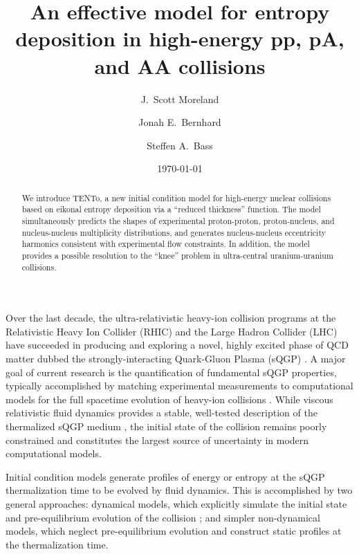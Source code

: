 \documentclass[aps,prc,reprint,amsmath,nofootinbib]{revtex4-1}
\newcommand{\psec}[1]{\phantomsection\addcontentsline{toc}{section}{#1}}
\newcommand{\trento}{T\raisebox{-.5ex}{R}ENTo}
\begin{document}
\title{An effective model for entropy deposition in high-energy pp, pA, and AA collisions}

\author{J.\ Scott Moreland}
\author{Jonah E.\ Bernhard}
\author{Steffen A.\ Bass}

\date{\today}


\begin{abstract}
  We introduce \trento, a new initial condition model for high-energy nuclear collisions based on eikonal entropy deposition via a ``reduced thickness'' function.
  The model simultaneously predicts the shapes of experimental proton-proton, proton-nucleus, and nucleus-nucleus multiplicity distributions, and generates nucleus-nucleus eccentricity harmonics consistent with experimental flow constraints.
  In addition, the model provides a possible resolution to the ``knee'' problem in ultra-central uranium-uranium collisions.
\end{abstract}


\maketitle

\psec{Introduction}

Over the last decade, the ultra-relativistic heavy-ion collision programs at the Relativistic Heavy Ion Collider (RHIC) and the Large Hadron Collider (LHC) have succeeded in producing and exploring a novel, highly excited phase of QCD matter dubbed the strongly-interacting Quark-Gluon Plasma (sQGP)
\cite{Arsene:2004fa,Adcox:2004mh,Back:2004je,Adams:2005dq,Gyulassy:2004zy,Muller:2006ee,Muller:2012zq}.
A major goal of current research is the quantification of fundamental sQGP properties, typically accomplished by matching experimental measurements to computational models for the full spacetime evolution of heavy-ion collisions \cite{Petersen:2010zt,Novak:2013bqa}.
While viscous relativistic fluid dynamics provides a stable, well-tested description of the thermalized sQGP medium \cite{Baier:2006gy,Song:2007ux,Luzum:2008cw,Schenke:2010rr,Shen:2011eg,Shen:2014vra}, the initial state of the collision remains poorly constrained and constitutes the largest source of uncertainty in modern computational models.

Initial condition models generate profiles of energy or entropy at the sQGP thermalization time to be evolved by fluid dynamics.
This is accomplished by two general approaches:
dynamical models, which explicitly simulate the initial state and pre-equilibrium evolution of the collision \cite{Schenke:2012wb,vanderSchee:2013pia,Berges:2014yta,Kurkela:2014tea};
and simpler non-dynamical models, which neglect pre-equilibrium evolution and construct static profiles at the thermalization time.
\end{document}
